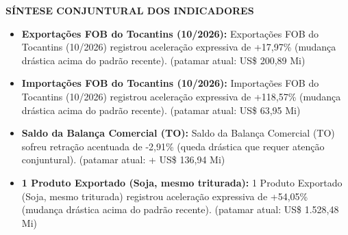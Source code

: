 \documentclass[10pt,a4paper]{article}
\begin{document}
{\hfill%
%
}

\vspace{0.08cm}
\par\vspace{0.05cm}
\par\vspace{4pt}
{\fontsize{7.8}{9.4}\selectfont\bfseries\color{corprimaria}\MakeUppercase{Síntese Conjuntural dos Indicadores}}\par\vspace{2pt}
{\scriptsize\color{cinzatexto}
\begin{itemize}[leftmargin=10pt, itemsep=1.2pt, topsep=1pt, parsep=0pt]
   \item \textbf{\color{corprimaria}Exportações FOB do Tocantins (10/2026):} Exportações FOB do Tocantins (10/2026) registrou aceleração expressiva de +17,97\% (mudança drástica acima do padrão recente). (patamar atual: US\$ 200,89 Mi)
   \item \textbf{\color{corprimaria}Importações FOB do Tocantins (10/2026):} Importações FOB do Tocantins (10/2026) registrou aceleração expressiva de +118,57\% (mudança drástica acima do padrão recente). (patamar atual: US\$ 63,95 Mi)
   \item \textbf{\color{corprimaria}Saldo da Balança Comercial (TO):} Saldo da Balança Comercial (TO) sofreu retração acentuada de -2,91\% (queda drástica que requer atenção conjuntural). (patamar atual: + US\$ 136,94 Mi)
   \item \textbf{\color{corprimaria}1\textordmasculine{} Produto Exportado (Soja, mesmo triturada):} 1\textordmasculine{} Produto Exportado (Soja, mesmo triturada) registrou aceleração expressiva de +54,05\% (mudança drástica acima do padrão recente). (patamar atual: US\$ 1.528,48 Mi)
\end{itemize}
}
\par\vspace{0.05cm}
\end{document}
